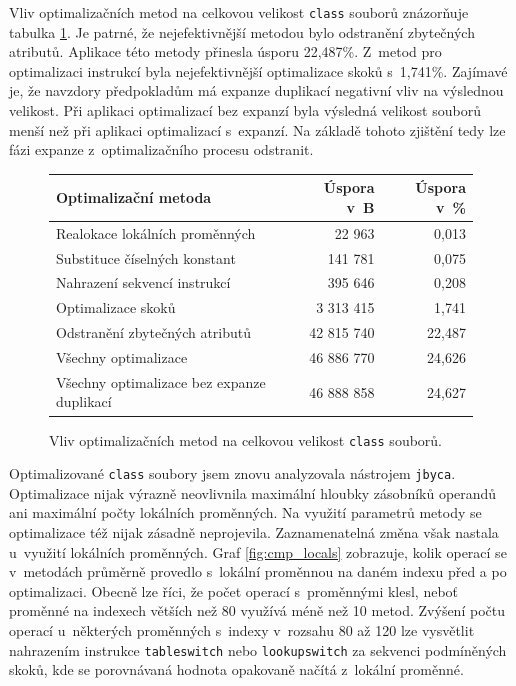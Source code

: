 Vliv optimalizačních metod na celkovou velikost \texttt{class} souborů znázorňuje tabulka \ref{tab:sizes}. Je patrné, že nejefektivnější metodou bylo odstranění zbytečných atributů. Aplikace této metody přinesla úsporu 22,487\%. Z~metod pro optimalizaci instrukcí byla nejefektivnější optimalizace skoků s~1,741\%. Zajímavé je, že navzdory předpokladům má expanze duplikací negativní vliv na výslednou velikost. Při aplikaci optimalizací bez expanzí byla výsledná velikost souborů menší než při aplikaci optimalizací s~expanzí. Na základě tohoto zjištění tedy lze fázi expanze z~optimalizačního procesu odstranit.

\begin{figure}
\begin{center}
  \begin{tabular}{l r r} \hline

\textbf{Optimalizační metoda}	&	\textbf{Úspora v~B}	&	\textbf{Úspora v~\%}	\\\hline
Realokace lokálních proměnných					&	22 963	&			0,013	\\
Substituce číselných konstant					&	141 781	&			0,075	\\
Nahrazení sekvencí instrukcí					&	395 646	&			0,208	\\
Optimalizace skoků					&	3 313 415	&			1,741	\\
Odstranění zbytečných atributů			&	42 815 740			&	22,487			\\
Všechny optimalizace			&	46 886 770			&	24,626			\\
Všechny optimalizace bez expanze duplikací			&	46 888 858			&	24,627			\\\hline

  \end{tabular}
\end{center}
\caption{Vliv optimalizačních metod na celkovou velikost \texttt{class} souborů.}
\label{tab:sizes}
\end{figure}
          
Optimalizované \texttt{class} soubory jsem znovu analyzovala nástrojem \texttt{jbyca}. Optimalizace nijak výrazně neovlivnila maximální hloubky zásobníků operandů ani maximální počty lokálních proměnných. Na využití parametrů metody se optimalizace též nijak zásadně neprojevila. Zaznamenatelná změna však nastala u~využití lokálních proměnných. Graf \ref{fig:cmp_locals} zobrazuje, kolik operací se v~metodách průměrně provedlo s~lokální proměnnou na daném indexu před a po optimalizaci. Obecně lze říci, že počet operací s~proměnnými klesl, neboť proměnné na indexech větších než 80 využívá méně než 10 metod. Zvýšení počtu operací u~některých proměnných s~indexy v~rozsahu 80 až 120 lze vysvětlit nahrazením instrukce \texttt{tableswitch} nebo \texttt{lookupswitch} za sekvenci podmíněných skoků, kde se porovnávaná hodnota opakovaně načítá z~lokální proměnné. 

